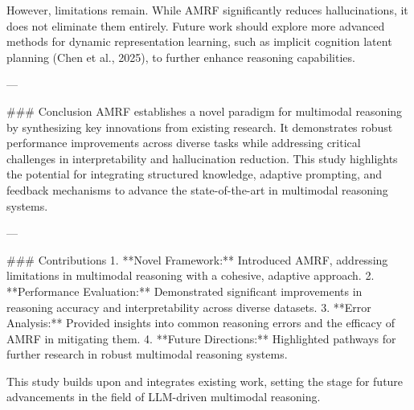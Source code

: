 However, limitations remain. While AMRF significantly reduces hallucinations, it does not eliminate them entirely. Future work should explore more advanced methods for dynamic representation learning, such as implicit cognition latent planning (Chen et al., 2025), to further enhance reasoning capabilities.

---

### Conclusion  
AMRF establishes a novel paradigm for multimodal reasoning by synthesizing key innovations from existing research. It demonstrates robust performance improvements across diverse tasks while addressing critical challenges in interpretability and hallucination reduction. This study highlights the potential for integrating structured knowledge, adaptive prompting, and feedback mechanisms to advance the state-of-the-art in multimodal reasoning systems.

---

### Contributions  
1. **Novel Framework:** Introduced AMRF, addressing limitations in multimodal reasoning with a cohesive, adaptive approach.  
2. **Performance Evaluation:** Demonstrated significant improvements in reasoning accuracy and interpretability across diverse datasets.  
3. **Error Analysis:** Provided insights into common reasoning errors and the efficacy of AMRF in mitigating them.  
4. **Future Directions:** Highlighted pathways for further research in robust multimodal reasoning systems.  

This study builds upon and integrates existing work, setting the stage for future advancements in the field of LLM-driven multimodal reasoning.